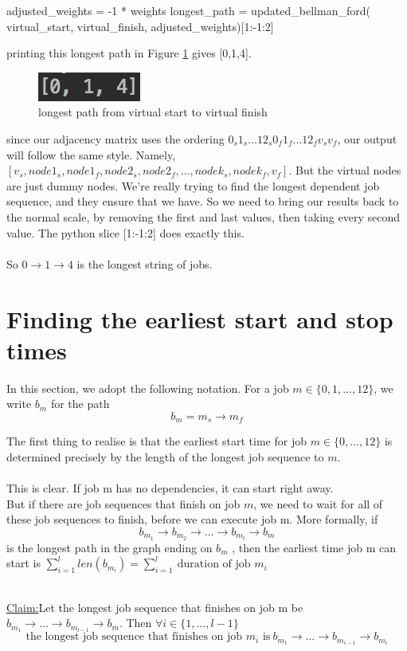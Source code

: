 \documentclass[paper=a4, fontsize=12pt]{scrartcl} %
\newenvironment{claim}[1]{\par\noindent\underline{Claim:}\space#1}{}
\numberwithin{equation}{section}       %
\numberwithin{figure}{section}         %
\numberwithin{table}{section}          %
\begin{document}
\begin{python}
    adjusted_weights = -1 * weights
    longest_path = updated_bellman_ford(
        virtual_start, virtual_finish, adjusted_weights)[1:-1:2]
\end{python}
printing this longest path in Figure \ref{long} gives [0,1,4].
\begin{figure}[h]\label{long}
\caption{longest path from virtual start to virtual finish}
\centering
\includegraphics[scale=0.9]{long}
\end{figure}

\bcattention \quad since our adjacency matrix uses the ordering $0_{s} 1_{s} \dots 12_{s} 0_{f} 1_{f} \dots 12_{f} v_{s} v_{f}$, our output will follow the same style. Namely, $[v_{s},node1_{s},node1_{f},node2_{s},node2_{f},\dots,nodek_{s},nodek_{f},v_{f}]$. But the virtual nodes are just dummy nodes. We're really trying to find the longest dependent job sequence, and they ensure that we have. So we need to bring our results back to the normal scale, by removing the first and last values, then taking every second value. The python slice [1:-1:2] does exactly this. \\ \\

So $0 \to 1 \to 4$ is the longest string of jobs.

\section{Finding the earliest start and stop times}
In this section, we adopt the following notation. For a job $m \in \{0,1,\dots,12 \}$, we write $b_{m}$ for the path 
$$ b_{m} = m_{s} \to m_{f} $$

The first thing to realise is that the earliest start time for job $m \in \{ 0, \dots, 12 \}$ is determined precisely by the length of the longest job sequence to $m$. \\ \\
This is clear. If job m has no dependencies, it can start right away. \\ 
But if there are job sequences that finish on job $m$, we need to wait for all of these job sequences to finish, before we can execute job m. More formally, if $$ b_{m_{1}} \to b_{m_{2}} \to \dots \to b_{m_{l}} \to b_{m}$$
is the longest path in the graph ending on $b_{m}$ , then the earliest time job m can start is $\sum_{i=1}^{l}len(b_{m_{i}}) = \sum_{i=1}^{l} \ \text{duration of job $m_{i}$}$ \\ \\
\begin{claim}
Let the longest job sequence that finishes on job m be $b_{m_{1}} \to \dots \to b_{m_{l-1}} \to b_{m}$. Then $\forall i \in \{ 1,\dots,l-1\}$ $$\text{the longest job sequence that finishes on job $m_{i}$ is} \ b_{m_{1}} \to \dots \to b_{m_{i-1}} \to b_{m_{i}}$$
\end{claim}
\end{document}
